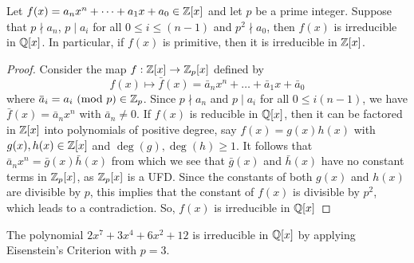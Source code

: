 \documentclass[11pt]{article}
\newcommand{\Mod}[1]{\ (\mathrm{mod}\ #1)}
\begin{document}
\begin{theorem} \label{eisenstien}
Let $f(x) = a_nx^n + \dots + a_1x + a_0 \in \mathbb{Z}[x]$ and let $p$ be a prime
integer. Suppose that $p \nmid a_n$, $p \mid a_i$ for all $0 \leq i \leq (n-1)$ and
$p^2 \nmid a_0$, then $f(x)$ is irreducible in $\mathbb{Q}[x]$. In particular, if
$f(x)$ is primitive, then it is irreducible in $\mathbb{Z}[x]$.
\end{theorem}
\begin{proof}
Consider the map $f: \mathbb{Z}[x] \to \mathbb{Z}_p[x]$ defined by
\begin{equation*}
f(x) \mapsto \bar f(x) = \bar a_nx^n + \dots + \bar a_1x + \bar a_0
\end{equation*}
where $\bar a_i = a_i \Mod{p} \in \Z_p$. Since $p \nmid a_n$ and $p \mid a_i$
for all $0 \leq i (n-1)$, we have $\bar f(x) = \bar a_nx^n$ with $\bar a_n \neq
0$. If $f(x)$ is reducible in $\mathbb{Q}[x]$, then it can be factored in $\mathbb{Z}[x]$ into
polynomials of positive degree, say $f(x) = g(x)h(x)$ with $g(x), h(x) \in
\mathbb{Z}[x]$ and $\deg(g), \deg(h) \geq 1$. It follows that $\bar a_nx^n = \bar
g(x) \bar h(x)$ from which we see that $\bar g(x)$ and $\bar h(x)$ have no constant
terms in $\mathbb{Z}_p[x]$, as $\mathbb{Z}_p[x]$ is a UFD\@. Since the constants of both $g(x)$
and $h(x)$ are divisible by $p$, this implies that the constant of $f(x)$ is
divisible by $p^{2}$, which leads to a contradiction. So, $f(x)$ is irreducible
in $\mathbb{Q}[x]$
\end{proof}
\begin{example}
The polynomial $2x^7 + 3x^4 + 6x^2 + 12$ is irreducible in $\mathbb{Q}[x]$ by applying
Eisenstein's Criterion with $p=3$.
\end{example}
\end{document}
